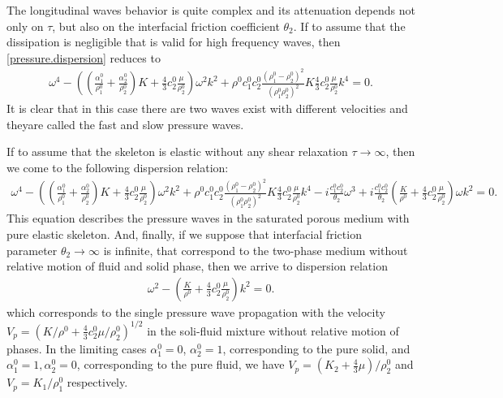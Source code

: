 \documentclass[3p,times]{elsarticle}
\begin{document}
The longitudinal waves behavior is quite complex and its attenuation depends not only on $\tau$, but also on the interfacial friction coefficient $\theta_2$. If to assume that the dissipation is negligible that is valid for high frequency waves, then \eqref{pressure.dispersion} reduces to 
\begin{align} \label{pressure.nodissipation}
\omega^4 - \left(\left(\frac{\alpha_1^0}{\rho_1^0}+\frac{\alpha_2^0}{\rho_2^0}\right)K+
\frac{4}{3}c^0_2\frac{\mu}{\rho_2^0} \right)\omega^2 k^2 +
\rho^0c^0_1c^0_2\frac{\left(\rho^0_1-\rho^0_2\right)^2}{(\rho^0_1\rho^0_2)^2}K
\frac{4}{3}c^0_2\frac{\mu}{\rho^0_2} k^4=0.
\end{align}
It is clear that in this case there are two waves exist with different velocities and theyare called the fast and slow pressure waves.

If to assume that the skeleton is elastic without any shear relaxation $\tau \rightarrow \infty$, then we come to the following dispersion relation:
\begin{align} %
\omega^4 - \left(\left(\frac{\alpha_1^0}{\rho_1^0}+\frac{\alpha_2^0}{\rho_2^0}\right)K+
\frac{4}{3}c^0_2\frac{\mu}{\rho_2^0} \right)\omega^2 k^2 +
\rho^0c^0_1c^0_2\frac{\left(\rho^0_1-\rho^0_2\right)^2}{(\rho^0_1\rho^0_2)^2}K
\frac{4}{3}c^0_2\frac{\mu}{\rho^0_2} k^4 - 
i\frac{c^0_1c^0_2}{\theta_2}\omega^3 +  
i
\frac{c^0_1c^0_2}{\theta_2}\left(\frac{K}{\rho^0}+\frac{4}{3}c^0_2\frac{\mu}{\rho^0_2}
\right) \omega k^2=0.
\end{align}
This equation describes the pressure waves in the saturated porous medium with pure elastic skeleton.
And, finally, if we suppose that interfacial friction parameter $\theta_2 \rightarrow \infty$ is infinite, that correspond to the two-phase medium without relative motion of fluid and solid phase, then we arrive to dispersion relation
\begin{align} 
\omega^2- \left(\frac{K}{\rho^0}+\frac{4}{3}c^0_2\frac{\mu}{\rho^0_2}
\right) k^2=0.
\end{align}
which corresponds to the single pressure wave propagation with the velocity $V_p=\left({K}/{\rho^0}+\frac{4}{3}c^0_2{\mu}/{\rho^0_2}
\right)^{1/2}$ in the soli-fluid mixture without relative motion of phases. 
In the limiting cases $\alpha_1^0=0$, $\alpha_2^0=1$, corresponding to the pure solid, and  
$\alpha_1^0=1, \alpha_2^0=0$, corresponding to the pure fluid, we have $V_p=(K_2+\frac{4}{3}\mu)/\rho_2^0$ and $V_p=K_1/\rho_1^0$ respectively.
\end{document}
